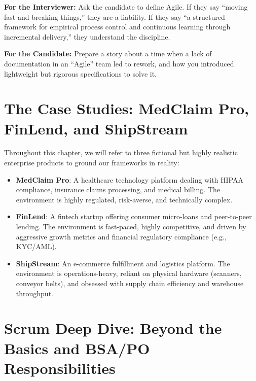\documentclass[
  11pt,
  openany,
  oneside]{book}
\providecommand{\tightlist}{%
  \setlength{\itemsep}{0pt}\setlength{\parskip}{0pt}}
\renewenvironment{quote}{\begin{customquote}}{\end{customquote}}
\begin{document}
\begin{quote}
\textbf{For the Interviewer:} Ask the candidate to define Agile. If they
say ``moving fast and breaking things,'' they are a liability. If they
say ``a structured framework for empirical process control and
continuous learning through incremental delivery,'' they understand the
discipline.
\end{quote}

\begin{quote}
\textbf{For the Candidate:} Prepare a story about a time when a lack of
documentation in an ``Agile'' team led to rework, and how you introduced
lightweight but rigorous specifications to solve it.
\end{quote}

\section{The Case Studies: MedClaim Pro, FinLend, and
ShipStream}\label{the-case-studies-medclaim-pro-finlend-and-shipstream}

Throughout this chapter, we will refer to three fictional but highly
realistic enterprise products to ground our frameworks in reality:

\begin{itemize}
\tightlist
\item
  \textbf{MedClaim Pro}: A healthcare technology platform dealing with
  HIPAA compliance, insurance claims processing, and medical billing.
  The environment is highly regulated, risk-averse, and technically
  complex.
\item
  \textbf{FinLend}: A fintech startup offering consumer micro-loans and
  peer-to-peer lending. The environment is fast-paced, highly
  competitive, and driven by aggressive growth metrics and financial
  regulatory compliance (e.g., KYC/AML).
\item
  \textbf{ShipStream}: An e-commerce fulfillment and logistics platform.
  The environment is operations-heavy, reliant on physical hardware
  (scanners, conveyor belts), and obsessed with supply chain efficiency
  and warehouse throughput.
\end{itemize}

\section{Scrum Deep Dive: Beyond the Basics and BSA/PO
Responsibilities}\label{scrum-deep-dive-beyond-the-basics-and-bsapo-responsibilities}
\end{document}
